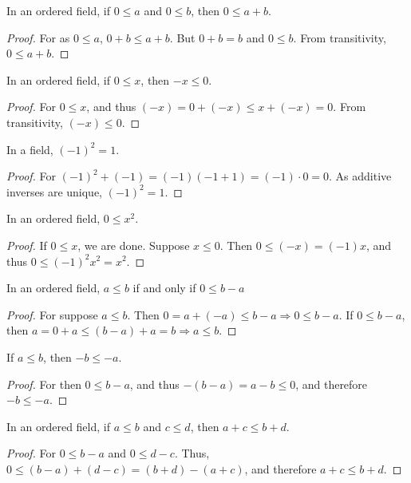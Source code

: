     \begin{theorem}
        In an ordered field, if $0\leq a$ and $0\leq b$, then $0\leq a+b$.
    \end{theorem}
    \begin{proof}
        For as $0\leq a$, $0+b\leq a+b$. But $0+b = b$ and $0\leq b$. From
        transitivity, $0\leq a+b$.
    \end{proof}
    \begin{theorem}
        In an ordered field, if $0\leq x$, then $-x\leq 0$.
    \end{theorem}
    \begin{proof}
        For $0\leq x$, and thus $(-x)=0+(-x)\leq x+(-x)=0$. From transitivity,
        $(-x)\leq 0$.
    \end{proof}
    \begin{theorem}
        In a field, $(-1)^2 = 1$.
    \end{theorem}
    \begin{proof}
        For $(-1)^2 +(-1) = (-1)(-1+1) = (-1)\cdot 0 = 0$. As additive inverses
        are unique, $(-1)^2 = 1$.
    \end{proof}
    \begin{theorem}
        In an ordered field, $0\leq x^2$.
    \end{theorem}
    \begin{proof}
        If $0 \leq x$, we are done. Suppose $x\leq 0$. Then
        $0\leq(-x)=(-1)x$, and thus $0\leq (-1)^2 x^2=x^2$.
    \end{proof}
    \begin{theorem}
        In an ordered field, $a\leq b$ if and only if $0 \leq b-a$
    \end{theorem}
    \begin{proof}
        For suppose $a\leq b$. Then $0=a+(-a)\leq b-a\Rightarrow 0 \leq b-a$.
        If $0\leq b-a$, then $a=0+a \leq (b-a)+a = b\Rightarrow a\leq b$.
    \end{proof}
    \begin{theorem}
        If $a\leq b$, then $-b\leq -a$.
    \end{theorem}
    \begin{proof}
        For then $0 \leq b-a$, and thus $-(b-a)=a-b\leq 0$, and therefore
        $-b\leq-a$.
    \end{proof}
    \begin{theorem}
        In an ordered field, if $a\leq b$ and $c\leq d$, then $a+c \leq b+d$.
    \end{theorem}
    \begin{proof}
        For $0\leq b-a$ and $0\leq d-c$. Thus,
        $0\leq(b-a)+(d-c)=(b+d)-(a+c)$, and therefore $a+c \leq b+d$.
    \end{proof}
